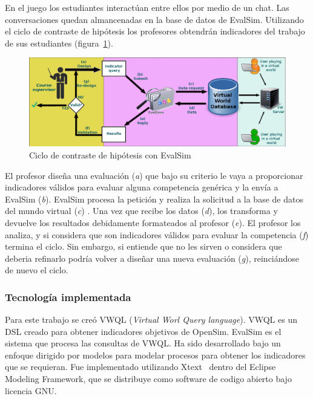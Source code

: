 En el juego los estudiantes interactúan entre ellos por medio de un chat. Las conversaciones quedan almancenadas en la base de datos de EvalSim. Utilizando el ciclo de contraste de hipótesis los profesores obtendrán indicadores del trabajo de sus estudiantes (figura~\ref{fig:EvalSimArchitecture}).

\begin{figure}
  \begin{center}
    \includegraphics[scale=0.29]{EvalSimArchitecture.png}
  \end{center}
  \caption{Ciclo de contraste de hipótesis con EvalSim}
  \label{fig:EvalSimArchitecture}
\end{figure}

El profesor diseña una evaluación (\emph{a}) que bajo su criterio le vaya a proporcionar indicadores válidos para evaluar alguna competencia genérica y la envía a EvalSim (\emph{b}). EvalSim procesa la petición y realiza la solicitud a la base de datos del mundo virtual (\emph{c}) . Una vez que recibe los datos (\emph{d}), los transforma y devuelve los resultados debidamente formateados al profesor (\emph{e}). El profesor los analiza, y si considera que son indicadores válidos para evaluar la competencia (\emph{f}) termina el ciclo. Sin embargo, si entiende que no les sirven o considera que deberia refinarlo podría volver a diseñar una nueva evaluación (\emph{g}), reinciándose de nuevo el ciclo.

\subsubsection{Tecnología implementada}

Para este trabajo se creó VWQL (\emph{Virtual Worl Query language}). VWQL es un DSL creado para obtener indicadores objetivos de OpenSim. EvalSim es el sistema que procesa las consultas de VWQL. Ha sido desarrollado bajo un enfoque dirigido por modelos para modelar procesos para obtener los indicadores que se requieran. Fue implementado utilizando Xtext~\cite{eysholdt2010xtext} dentro del Eclipse Modeling Framework, que se distribuye como software de codigo abierto bajo licencia GNU.

